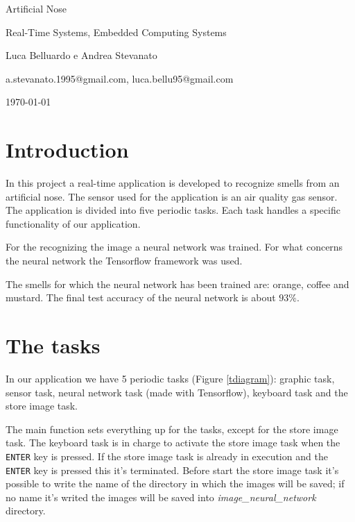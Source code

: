 \documentclass[12pt]{article}
\begin{document}
\begin{titlepage}
    \centering
	\Huge Artificial Nose\par
	\vspace{1cm}
	\Large Real-Time Systems, Embedded Computing Systems\par
	\vspace{1.5cm}
    \Large Luca Belluardo e Andrea Stevanato\par
    \vspace{1cm}
    \large a.stevanato.1995@gmail.com, luca.bellu95@gmail.com\par
    \large 
	\vfill
	{\large \today\par}
\end{titlepage}

\section{Introduction}
In this project a real-time application is developed to recognize smells from an
artificial nose. The sensor used for the application is an air quality gas 
sensor. The application is divided into five periodic tasks. Each task handles
a specific functionality of our application.

For the recognizing the image a neural network was trained. For what concerns
the neural network the Tensorflow framework was used.

The smells for which the neural network has been trained are: orange, coffee
and mustard. The final test accuracy of the neural network is about $93\%$.

\section{The tasks}
In our application we have 5 periodic tasks (Figure \ref{tdiagram}): graphic
task, sensor task, neural network task (made with Tensorflow), keyboard task
and the store image task.

The main function sets everything up for the tasks, except for the store
image task. The keyboard task is in charge to activate the store image task
when the \texttt{ENTER} key is pressed. If the store image task is already in
execution and the \texttt{ENTER} key is pressed this it's terminated.
Before start the store image task it's possible to write the name of the
directory in which the images will be saved; if no name it's writed the
images will be saved into \textit{image\_neural\_network} directory.
\end{document}
